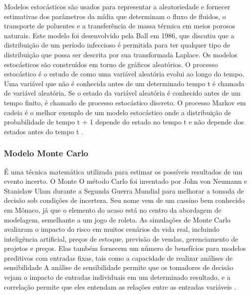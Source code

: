 \documentclass[11pt, letterpaper, portuguese]{article}
\begin{document}
\par{Modelos estocásticos são usados para representar a aleatoriedade e fornecer estimativas dos parâmetros da mídia que determinam o fluxo de fluidos, o transporte de poluentes e a transferência de massa térmica em meios porosos naturais. Este modelo foi desenvolvido pela Ball em 1986, que discutiu que a distribuição de um período infeccioso é permitida para ter qualquer tipo de distribuição que possa ser descrita por sua transformada Laplace. Os modelos estocásticos são construídos em torno de gráficos aleatórios. O processo estocástico é o estudo de como uma variável aleatória evolui ao longo do tempo. Uma variável que não é conhecida antes de um determinado tempo t é chamada de variável aleatória. Se o estado da variável aleatória é conhecido antes de um tempo finito, é chamado de processo estocástico discreto. O processo Markov em cadeia é o melhor exemplo de um modelo estocástico onde a distribuição de probabilidade de tempo t + 1 depende do estado no tempo t e não depende dos estados antes do tempo t \cite{stochastic_model_overview_sciencedirect} \cite{statistical_models_2003}.}

\subsubsection{Modelo Monte Carlo}

    \par{É uma técnica matemática utilizada para estimar os possíveis resultados de um evento incerto. O Monte O método Carlo foi inventado por John von Neumann e Stanislaw Ulam durante a Segunda Guerra Mundial para melhorar a tomada de decisão sob condições de incerteza. Seu nome vem de um cassino bem conhecido em Mônaco, já que o elemento do acaso está no centro da abordagem de modelagem, semelhante a um jogo de roleta. As simulações de Monte Carlo avaliaram o impacto do risco em muitos cenários da vida real, incluindo inteligência artificial, preços de estoque, previsão de vendas, gerenciamento de projetos e preços. Elas também fornecem um número de benefícios para modelos preditivos com entradas fixas, tais como a capacidade de realizar análises de sensibilidade A análise de sensibilidade permite que os tomadores de decisão vejam o impacto de entradas individuais em um determinado resultado, e a correlação permite que eles entendam as relações entre as entradas variáveis \cite{garfinkel_shevtsov_guo_2017}.}
  
\end{document}
